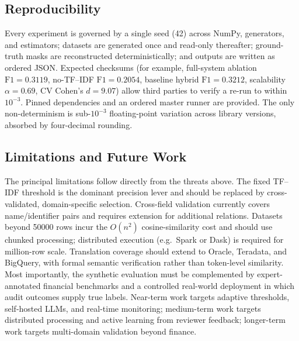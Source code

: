 \documentclass{ieeeaccess}
\begin{document}
\subsection{Reproducibility}
\label{subsec:repro}
Every experiment is governed by a single seed (42) across NumPy, generators, and estimators; datasets are generated once
and read-only thereafter; ground-truth masks are reconstructed deterministically; and outputs are written as ordered JSON.
Expected checksums (for example, full-system ablation $\mathrm{F1}=0.3119$, no-TF--IDF $\mathrm{F1}=0.2054$, baseline
hybrid $\mathrm{F1}=0.3212$, scalability $\alpha=0.69$, CV Cohen's $d=9.07$) allow third parties to verify a re-run to
within $10^{-3}$. Pinned dependencies and an ordered master runner are provided. The only non-determinism is sub-$10^{-3}$
floating-point variation across library versions, absorbed by four-decimal rounding.

\subsection{Limitations and Future Work}
\label{subsec:limitations}
The principal limitations follow directly from the threats above. The fixed TF--IDF threshold is the dominant precision
lever and should be replaced by cross-validated, domain-specific selection. Cross-field validation currently covers
name/identifier pairs and requires extension for additional relations. Datasets beyond \num{50000} rows incur the
$O(n^2)$ cosine-similarity cost and should use chunked processing; distributed execution (e.g.\ Spark or Dask) is required
for million-row scale. Translation coverage should extend to Oracle, Teradata, and BigQuery, with formal semantic
verification rather than token-level similarity. Most importantly, the synthetic evaluation must be complemented by
expert-annotated financial benchmarks and a controlled real-world deployment in which audit outcomes supply true labels.
Near-term work targets adaptive thresholds, self-hosted LLMs, and real-time monitoring; medium-term work targets
distributed processing and active learning from reviewer feedback; longer-term work targets multi-domain validation beyond
finance.

\end{document}
